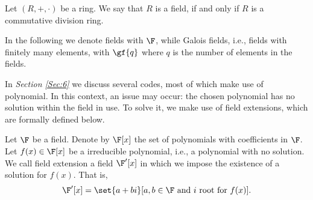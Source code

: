 \documentclass{subfiles}
\begin{document}
    \begin{definition*}
        Let \((R, +, \cdot)\) be a ring. We say that \(R\) is a field, 
            if and only if  \(R\) is a commutative division ring.
    \end{definition*}

    In the following we denote fields with \(\F\), while Galois fields, 
        i.e., fields with finitely many elements, with \(\gf{q}\) where \(q\)
        is the number of elements in the fields.

    In \emph{Section \ref{Sec:6}} we discuss several codes, most of which make use of polynomial.
        In this context, an issue may occur: the chosen polynomial has no solution within the field in use.
        To solve it, we make use of field extensions, which are formally defined below.

    \begin{definition*}
        Let \(\F\) be a field. Denote by \(\F[x]\) the set of polynomials with coefficients
            in \(\F\)\footnotemark[1]. Let \(f(x) \in \F[x]\) be a irreducible polynomial,
            i.e., a polynomial with no solution\footnotemark[2]. We call field extension 
            a field \(\F'[x]\) in which we impose the existence of a solution for \(f(x)\).
            That is, 
            \[
                \F'[x] = \set{a + bi}[a, b \in \F \text{ and } i \text{ root for } f(x)].
            \]
    \end{definition*}

\end{document}
